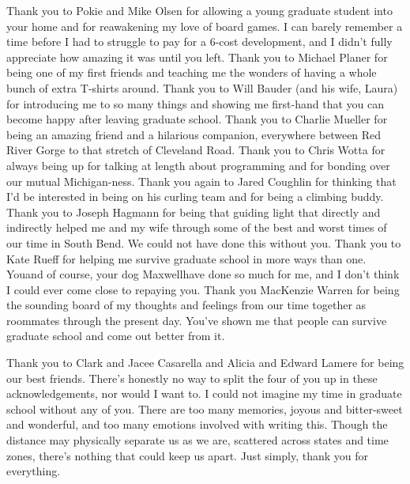 \begin{acknowledge}
Thank you to Pokie and Mike Olsen for allowing a young graduate student
into your home and for reawakening my love of board games. I can barely
remember a time before I had to struggle to pay for a 6-cost
development, and I didn't fully appreciate how amazing it was until you
left. Thank you to Michael Planer for being one of my first friends and
teaching me the wonders of having a whole bunch of extra T-shirts
around. Thank you to Will Bauder (and his wife, Laura) for introducing
me to so many things and showing me first-hand that you can become happy
after leaving graduate school. Thank you to Charlie Mueller for being an
amazing friend and a hilarious companion, everywhere between Red River
Gorge to that stretch of Cleveland Road. Thank you to Chris Wotta for
always being up for talking at length about programming and for bonding
over our mutual Michigan-ness. Thank you again to Jared Coughlin for
thinking that I'd be interested in being on his curling team and for
being a climbing buddy. Thank you to Joseph Hagmann for being that
guiding light that directly and indirectly helped me and my wife through
some of the best and worst times of our time in South Bend. We could not
have done this without you. Thank you to Kate Rueff for helping me
survive graduate school in more ways than one. You\textemdash{}and of
course, your dog Maxwell\textemdash{}have done so much for me, and I
don't think I could ever come close to repaying you. Thank you MacKenzie
Warren for being the sounding board of my thoughts and feelings from our
time together as roommates through the present day. You've shown me that
people can survive graduate school and come out better from it.

Thank you to Clark and Jacee Casarella and Alicia and Edward Lamere for
being our best friends. There's honestly no way to split the four of you
up in these acknowledgements, nor would I want to. I could not imagine
my time in graduate school without any of you. There are too many
memories, joyous and bitter-sweet and wonderful, and too many emotions
involved with writing this. Though the distance may physically separate
us as we are, scattered across states and time zones, there's nothing
that could keep us apart. Just simply, thank you for everything.


\end{acknowledge}
